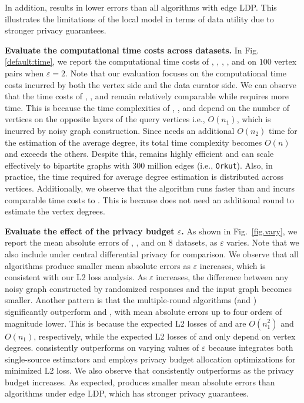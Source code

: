 {
In addition, \cdp results in lower errors than all algorithms with edge LDP. 
This illustrates the limitations of the local model in terms of data utility due to stronger privacy guarantees. 
}


\noindent
\textbf{Evaluate the computational time costs across datasets.} 
{
In Fig. \ref{default:time}, we report the computational time costs of \naive, \bs, \advss, \advds, and \advdeg on $100$ vertex pairs when $\varepsilon = 2$. }
Note that our evaluation focuses on the computational time costs incurred by both the vertex side and the data curator side. 
We can observe that the time costs of \naive, \bs, and \advss remain relatively comparable while \advds requires more time. 
This is because the time complexities of \naive, \bs, and \advss depend on the number of vertices on the opposite layers of the query vertices i.e., $O(n_1)$, which is incurred by noisy graph construction. 
Since \advds needs an additional $O( n_2)$ time for the estimation of the average degree, its total time complexity becomes $O(n)$ and exceeds the others. 
Despite this, \advds remains highly efficient and can scale effectively to bipartite graphs with 300 million edges (i.e., \texttt{Orkut}). Also, in practice, the time required for average degree estimation is distributed across vertices. 
{Additionally, we observe that the \advdeg algorithm runs faster than \advds and incurs comparable time costs to \advss. This is because \advdeg does not need an additional round to estimate the vertex degrees. }

\noindent
\textbf{Evaluate the effect of the privacy budget $\varepsilon$.} 
As shown in Fig.~\ref{fig.vary}, we report the mean absolute errors of \naive, \bs, and \advds on 8 datasets, as $\varepsilon$ varies. 
{Note that we also include \cdp under central differential privacy for comparison.} 
We observe that all algorithms produce smaller mean absolute errors as $\varepsilon$ increases, which is consistent with our L2 loss analysis. 
As $\varepsilon$ increases, the difference between any noisy graph constructed by randomized responses and the input graph becomes smaller. 
Another pattern is that the multiple-round algorithms (\advss and \advds) significantly outperform \naive and \bs, with mean absolute errors up to four orders of magnitude lower. 
{This is because the expected L2 losses of \naive and \bs are $O(n_1^2)$ and $O(n_1)$, respectively, while the expected L2 losses of \advss and \advds only depend on vertex degrees.} 
\advds consistently outperforms \advss on varying values of $\varepsilon$ because \advds integrates both single-source estimators and employs privacy budget allocation optimizations for minimized L2 loss. 
We also observe that \bs consistently outperforms \naive as the privacy budget increases. 
{
As expected, \cdp produces smaller mean absolute errors than algorithms under edge LDP, which has stronger privacy guarantees. 
}

